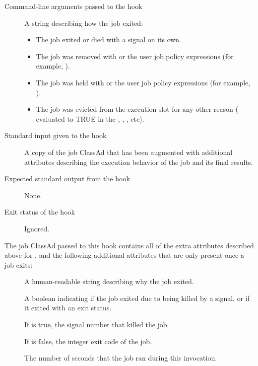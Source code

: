 \begin{description}
\item[Command-line arguments passed to the hook]
  A string describing how the job exited:
  \begin{itemize}
    \item \verb@exit@ The job exited or died with a signal on its own.
    \item \verb@remove@ The job was removed with  or the
    user job policy expressions (for example, ).
    \item \verb@hold@ The job was held with  or the
    user job policy expressions (for example, ).
    \item \verb@evict@ The job was evicted from the execution slot for
    any other reason ( evaluated to TRUE in the
    , , , etc).
  \end{itemize}

\item[Standard input given to the hook]
  A copy of the job ClassAd that has been augmented with additional
  attributes describing the execution behavior of the job and its
  final results.

\item[Expected standard output from the hook]
  None.

\item[Exit status of the hook]
  Ignored.
\end{description}

The job ClassAd passed to this hook contains all of the extra
attributes described above for , and
the following additional attributes that are only present once a job
exits:
\begin{description}
\item[]
  A human-readable string describing why the job exited.

\item[]
  A boolean indicating if the job exited due to being killed by a
  signal, or if it exited with an exit status.

\item[]
  If  is true, the signal number that killed the job.

\item[]
  If  is false, the integer exit code of the job.

\item[]
  The number of seconds that the job ran during this invocation.
\end{description}

